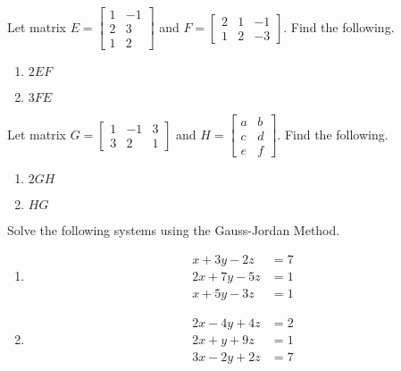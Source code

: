 \begin{puzzle}
    Let matrix \(E = \begin{bmatrix}
        1 & -1 \\
        2 & 3  \\
        1 & 2
    \end{bmatrix}\)
    and \(F = \begin{bmatrix}
        2 & 1 & -1 \\
        1 & 2 & -3
    \end{bmatrix}\). Find the following.
    \begin{enumerate}
        \item \(2EF\)
        \item \(3FE\)
    \end{enumerate}
\end{puzzle}

\begin{puzzle}
    Let matrix \(G = \begin{bmatrix}
        1 & -1 & 3 \\
        3 & 2  & 1
    \end{bmatrix}\)
    and \(H = \begin{bmatrix}
        a & b \\
        c & d \\
        e & f
    \end{bmatrix}\). Find the following.
    \begin{enumerate}
        \item \(2GH\)
        \item \(HG\)
    \end{enumerate}
\end{puzzle}

\begin{puzzle}
    Solve the following systems using the Gauss-Jordan Method.
    \begin{enumerate}
        \item
              \[\begin{aligned}
                      x + 3y - 2z  & = 7 \\
                      2x + 7y - 5z & = 1 \\
                      x + 5y - 3z  & = 1
                  \end{aligned}\]

        \item
              \[\begin{aligned}
                      2x - 4y + 4z & = 2 \\
                      2x + y + 9z  & = 1 \\
                      3x - 2y + 2z & = 7
                  \end{aligned}\]
    \end{enumerate}
\end{puzzle}

